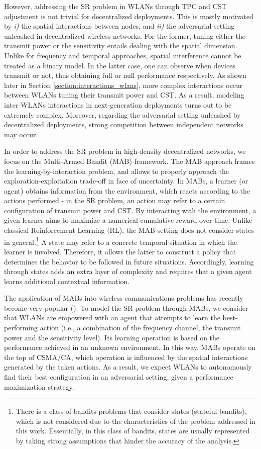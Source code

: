 \documentclass[preprint,12pt]{elsarticle}
\begin{document}
However, addressing the SR problem in WLANs through TPC and CST adjustment is not trivial for decentralized deployments. This is mostly motivated by \emph{i)} the spatial interactions between nodes, and \emph{ii)} the adversarial setting unleashed in decentralized wireless networks. For the former, tuning either the transmit power or the sensitivity entails dealing with the spatial dimension. Unlike for frequency and temporal approaches, spatial interference cannot be treated as a binary model. In the latter case, one can observe when devices transmit or not, thus obtaining full or null performance respectively. As shown later in Section \ref{section:interactions_wlans}, more complex interactions occur between WLANs tuning their transmit power and CST. As a result, modeling inter-WLANs interactions in next-generation deployments turns out to be extremely complex. Moreover, regarding the adversarial setting unleashed by decentralized deployments, strong competition between independent networks may occur. 

In order to address the SR problem in high-density decentralized networks, we focus on the Multi-Armed Bandit (MAB) framework. The MAB approach frames the learning-by-interaction problem, and allows to properly approach the exploration-exploitation trade-off in face of uncertainty. In MABs, a learner (or agent) obtains information from the environment, which reacts according to the actions performed - in the SR problem, an action may refer to a certain configuration of transmit power and CST. By interacting with the environment, a given learner aims to maximize a numerical cumulative reward over time. Unlike classical Reinforcement Learning (RL), the MAB setting does not consider states in general.\footnote{There is a class of bandits problems that consider states (stateful bandits), which is not considered due to the characteristics of the problem addressed in this work. Essentially, in this class of bandits, states are usually represented by taking strong assumptions that hinder the accuracy of the analysis.} A state may refer to a concrete temporal situation in which the learner is involved. Therefore, it allows the latter to construct a policy that determines the behavior to be followed in future situations. Accordingly, learning through states adds an extra layer of complexity and requires that a given agent learns additional contextual information.

The application of MABs into wireless communications problems has recently become very popular (\citealp{chen2010distributed, maghsudi2015channel, maghsudi2015joint}). To model the SR problem through MABs, we consider that WLANs are empowered with an agent that attempts to learn the best-performing action (i.e., a combination of the frequency channel, the transmit power and the sensitivity level). Its learning operation is based on the performance achieved in an unknown environment. In this way, MABs operate on the top of CSMA/CA, which operation is influenced by the spatial interactions generated by the taken actions. As a result, we expect WLANs to autonomously find their best configuration in an adversarial setting, given a performance maximization strategy.
\end{document}
